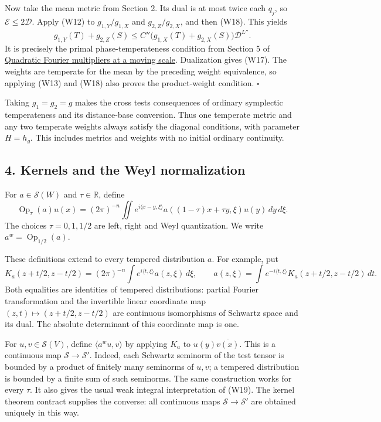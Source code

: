 \documentclass[
  11pt,
]{article}
\begin{document}
Now take the mean metric from Section 2. Its dual is at most twice each
\(q_j\), so \(\mathcal E\leq2\mathcal D\). Apply (W12) to
\(g_{1,Y}/g_{1,X}\) and \(g_{2,Z}/g_{2,X}\), and then (W18). This yields
\[
g_{1,Y}(T)+g_{2,Z}(S)
\leq C''\big(g_{1,X}(T)+g_{2,X}(S)\big)\mathcal D^{L''}.
\] It is precisely the primal phase-temperateness condition from Section
5 of \href{gauss-transform-estimates.pdf}{Quadratic Fourier multipliers
at a moving scale}. Dualization gives (W17). The weights are temperate
for the mean by the preceding weight equivalence, so applying (W13) and
(W18) also proves the product-weight condition. \(\square\)

Taking \(g_1=g_2=g\) makes the cross tests consequences of ordinary
symplectic temperateness and its distance-base conversion. Thus one
temperate metric and any two temperate weights always satisfy the
diagonal conditions, with parameter \(H=h_g\). This includes metrics and
weights with no initial ordinary continuity.

\subsection{4. Kernels and the Weyl
normalization}\label{kernels-and-the-weyl-normalization}

For \(a\in\mathcal S(W)\) and \(\tau\in\mathbb R\), define \[
\operatorname{Op}_\tau(a)u(x)
=(2\pi)^{-n}\iint e^{i\langle x-y,\xi\rangle}
a((1-\tau)x+\tau y,\xi)u(y)\,dy\,d\xi.
\tag{W19}
\] The choices \(\tau=0,1,1/2\) are left, right and Weyl quantization.
We write \(a^w=\operatorname{Op}_{1/2}(a)\).

These definitions extend to every tempered distribution \(a\). For
example, put \[
K_a(z+t/2,z-t/2)
=(2\pi)^{-n}\int e^{i\langle t,\xi\rangle}a(z,\xi)\,d\xi,
\qquad
a(z,\xi)=\int e^{-i\langle t,\xi\rangle}
K_a(z+t/2,z-t/2)\,dt.
\tag{W20}
\] Both equalities are identities of tempered distributions: partial
Fourier transformation and the invertible linear coordinate map
\((z,t)\mapsto(z+t/2,z-t/2)\) are continuous isomorphisms of Schwartz
space and its dual. The absolute determinant of this coordinate map is
one.

For \(u,v\in\mathcal S(V)\), define \(\langle a^wu,v\rangle\) by
applying \(K_a\) to \(u(y)\overline{v(x)}\). This is a continuous map
\(\mathcal S\to\mathcal S'\). Indeed, each Schwartz seminorm of the test
tensor is bounded by a product of finitely many seminorms of \(u,v\); a
tempered distribution is bounded by a finite sum of such seminorms. The
same construction works for every \(\tau\). It also gives the usual weak
integral interpretation of (W19). The kernel theorem contract supplies
the converse: all continuous maps \(\mathcal S\to\mathcal S'\) are
obtained uniquely in this way.
\end{document}
